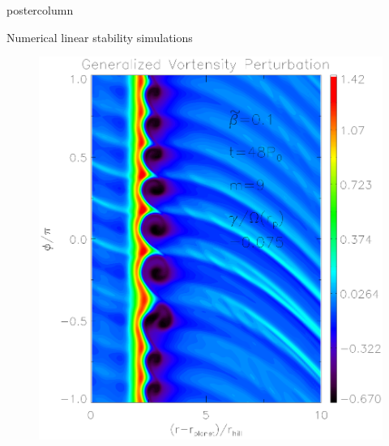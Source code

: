 \documentclass[final,hyperref={pdfpagelabels=false}]{beamer}
\begin{document}
\begin{frame}
\begin{columns}
\begin{column}{.49\textwidth}
\begin{beamercolorbox}[center,wd=\textwidth]{postercolumn}
\begin{minipage}[T]{.95\textwidth}
{\begin{block}{{\Large Numerical linear stability simulations}}
                    \hfill
                    \begin{minipage}[t]{0.49\textwidth}
                      \begin{figure}
                        \centering
                        \includegraphics[width=.9\textwidth,clip=false,trim=0.01cm
                          0cm .1cm 0cm]{Posterfig_lowb}
                      \end{figure}
                    \end{minipage}
                    \begin{minipage}[t]{0.49\textwidth}
                      \begin{figure}

\end{figure}
\end{minipage}
\end{block}}
\end{minipage}
\end{beamercolorbox}
\end{column}
\end{columns}
\end{frame}
\end{document}
